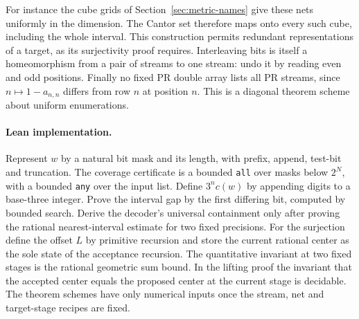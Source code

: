 For instance the cube grids of Section~\ref{sec:metric-names} give these
nets uniformly in the dimension. The Cantor set therefore maps onto every
such cube, including the whole interval. This construction permits redundant
representations of a target, as its surjectivity proof requires. Interleaving
bits is itself a homeomorphism from a pair of streams to one stream: undo
it by reading even and odd positions. Finally no fixed PR double array lists
all PR streams, since $n\mapsto1-a_{n,n}$ differs from row $n$ at position
$n$. This is a diagonal theorem scheme about uniform enumerations.

\paragraph{Lean implementation.}
Represent $w$ by a natural bit mask and its length, with prefix, append,
test-bit and truncation. The coverage certificate is a bounded
\texttt{all} over masks below $2^N$, with a bounded \texttt{any} over the
input list. Define $3^n c(w)$ by appending digits to a base-three integer.
Prove the interval gap by the first differing bit, computed by bounded
search. Derive the decoder's universal containment only after proving the
rational nearest-interval estimate for two fixed precisions. For the
surjection define the offset $L$ by primitive recursion and store the
current rational center as the sole state of the acceptance recursion.
The quantitative invariant at two fixed stages is the rational geometric
sum bound. In the lifting proof the invariant that the accepted center
equals the proposed center at the current stage is decidable. The theorem
schemes have only numerical inputs once the stream, net and target-stage
recipes are fixed.
